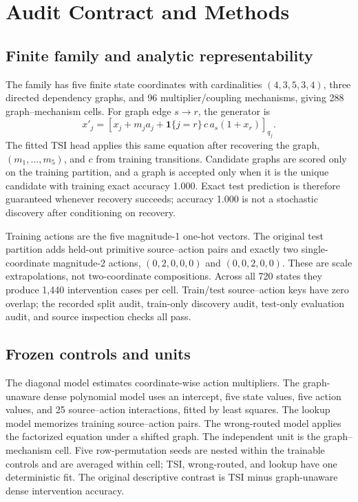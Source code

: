 \section{Audit Contract and Methods}

\subsection{Finite family and analytic representability}

The family has five finite state coordinates with cardinalities
\((4,3,5,3,4)\), three directed dependency graphs, and 96 multiplier/coupling
mechanisms, giving 288 graph--mechanism cells.  For graph edge \(s\to r\), the
generator is
\[
x'_j=\left[x_j+m_j a_j+
\mathbf 1\{j=r\}\,c\,a_s(1+x_r)\right]_{q_j}.
\]
The fitted TSI head applies this same equation after recovering the graph,
\((m_1,\ldots,m_5)\), and \(c\) from training transitions.  Candidate graphs
are scored only on the training partition, and a graph is accepted only when it
is the unique candidate with training exact accuracy 1.000.  Exact test
prediction is therefore guaranteed whenever recovery succeeds; accuracy 1.000
is not a stochastic discovery after conditioning on recovery.

Training actions are the five magnitude-1 one-hot vectors.  The original test
partition adds held-out primitive source--action pairs and exactly two
single-coordinate magnitude-2 actions,
\((0,2,0,0,0)\) and \((0,0,2,0,0)\).  These are scale extrapolations, not
two-coordinate compositions.  Across all 720 states they produce 1,440
intervention cases per cell.  Train/test source--action keys have zero overlap;
the recorded split audit, train-only discovery audit, test-only evaluation
audit, and source inspection checks all pass.

\subsection{Frozen controls and units}

The diagonal model estimates coordinate-wise action multipliers.  The
graph-unaware dense polynomial model uses an intercept, five state values, five
action values, and 25 source--action interactions, fitted by least squares.  The
lookup model memorizes training source--action pairs.  The wrong-routed model
applies the factorized equation under a shifted graph.  The independent unit is
the graph--mechanism cell.  Five row-permutation seeds are nested within the
trainable controls and are averaged within cell; TSI, wrong-routed, and lookup
have one deterministic fit.  The original descriptive contrast is TSI minus
graph-unaware dense intervention accuracy.

